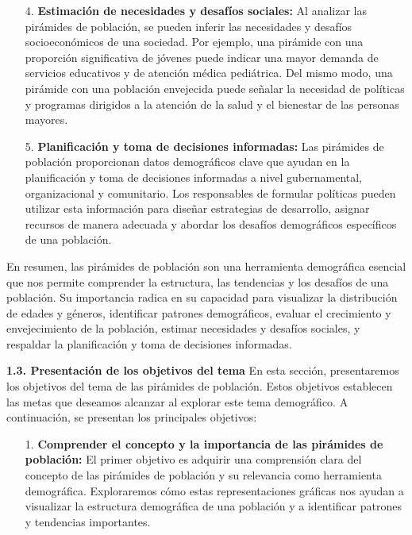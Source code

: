 \documentclass[8pt,a4paper]{beamer}
\begin{document}
{\begin{frame}{}
\begin{block}{}
\begin{enumerate}
\item[4.] \textbf{Estimación de necesidades y desafíos sociales:} Al analizar las pirámides de población, se pueden inferir las necesidades y desafíos socioeconómicos de una sociedad. Por ejemplo, una pirámide con una proporción significativa de jóvenes puede indicar una mayor demanda de servicios educativos y de atención médica pediátrica. Del mismo modo, una pirámide con una población envejecida puede señalar la necesidad de políticas y programas dirigidos a la atención de la salud y el bienestar de las personas mayores.

\item[5.] \textbf{Planificación y toma de decisiones informadas:} Las pirámides de población proporcionan datos demográficos clave que ayudan en la planificación y toma de decisiones informadas a nivel gubernamental, organizacional y comunitario. Los responsables de formular políticas pueden utilizar esta información para diseñar estrategias de desarrollo, asignar recursos de manera adecuada y abordar los desafíos demográficos específicos de una población.

\end{enumerate}
\end{block}
\end{frame}

\begin{frame}{}
\justifying
\begin{block}{}
\justifying
En resumen, las pirámides de población son una herramienta demográfica esencial que nos permite comprender la estructura, las tendencias y los desafíos de una población. Su importancia radica en su capacidad para visualizar la distribución de edades y géneros, identificar patrones demográficos, evaluar el crecimiento y envejecimiento de la población, estimar necesidades y desafíos sociales, y respaldar la planificación y toma de decisiones informadas.
\end{block}

\end{frame}

\begin{frame}{}
\begin{block}{\textbf{1.3. Presentación de los objetivos del tema}}
\justifying
En esta sección, presentaremos los objetivos del tema de las pirámides de población. Estos objetivos establecen las metas que deseamos alcanzar al explorar este tema demográfico. A continuación, se presentan los principales objetivos:
\begin{enumerate}
\justifying
\item[1.] \textbf{Comprender el concepto y la importancia de las pirámides de población:} El primer objetivo es adquirir una comprensión clara del concepto de las pirámides de población y su relevancia como herramienta demográfica. Exploraremos cómo estas representaciones gráficas nos ayudan a visualizar la estructura demográfica de una población y a identificar patrones y tendencias importantes.


\end{enumerate}
\end{block}
\end{frame}}
\end{document}
